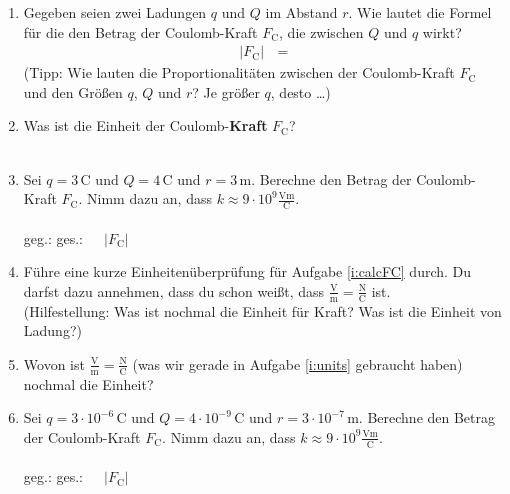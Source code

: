 \documentclass[task=1]{exercise}
\begin{document}
  \begin{enumerate}[label=\textnormal{\alph*)}]
    \item Gegeben seien zwei Ladungen $q$ und $Q$ im Abstand $r$. Wie lautet die Formel f\"ur die den Betrag der Coulomb-Kraft $F_\mathrm{C}$, die zwischen $Q$ und $q$ wirkt?
    \begin{align*}
      \left| F_\mathrm{C} \right| \, &=
    \end{align*}
    (Tipp: Wie lauten die Proportionalit\"aten zwischen der Coulomb-Kraft $F_\mathrm{C}$ und den Gr\"o{\ss}en $q$, $Q$ und $r$? Je gr\"o{\ss}er $q$, desto \ldots)
    \item Was ist die Einheit der Coulomb-{\bfseries Kraft} $F_\mathrm{C}$?\\~\\
    \item\label{i:calcFC} Sei $q = 3\,\mathrm{C}$ und $Q = 4\,\mathrm{C}$ und $r = 3\,\mathrm{m}$. Berechne den Betrag der Coulomb-Kraft $F_\mathrm{C}$. Nimm dazu an, dass $k\approx 9\cdot 10^9 \frac{\mathrm{Vm}}{\mathrm{C}}$.\\~\\
    geg.:\hspace{7cm} ges.:~~~$\left| F_\mathrm{C} \right|$\\\vspace{1cm}
    \item\label{i:units} Führe eine kurze Einheitenüberprüfung für Aufgabe \ref{i:calcFC} durch. Du darfst dazu annehmen, dass du schon weißt, dass $\frac{\mathrm{V}}{\mathrm{m}} = \frac{\mathrm{N}}{\mathrm{C}}$ ist.\\
    (Hilfestellung: Was ist nochmal die Einheit für Kraft? Was ist die Einheit von Ladung?)\\\vspace{.5cm}
    \item Wovon ist $\frac{\mathrm{V}}{\mathrm{m}} = \frac{\mathrm{N}}{\mathrm{C}}$ (was wir gerade in Aufgabe \ref{i:units} gebraucht haben) nochmal die Einheit?\\\vspace{.5cm}
    \item Sei $q = 3\cdot 10^{-6}\,\mathrm{C}$ und $Q = 4\cdot 10^{-9}\,\mathrm{C}$ und $r = 3\cdot 10^{-7}\,\mathrm{m}$. Berechne den Betrag der Coulomb-Kraft $F_\mathrm{C}$. Nimm dazu an, dass $k\approx 9\cdot 10^9 \frac{\mathrm{Vm}}{\mathrm{C}}$.\\~\\
    geg.:\hspace{7cm} ges.:~~~$\left| F_\mathrm{C} \right|$\\\vspace{.5cm}
  \end{enumerate}  
  
\end{document}
